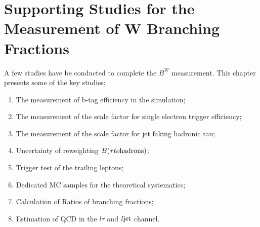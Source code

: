 \chapter{Supporting Studies for the Measurement of W Branching Fractions}
\label{sec:app}

A few studies have be conducted to complete the $B^W$ measurement. This chapter presents some of the key studies:
\begin{enumerate}
    \item The measurement of b-tag efficiency in the simulation;
    \item The measurement of the scale factor for single electron trigger efficiency;
    \item The measurement of the scale factor for jet faking hadronic tau;
    \item Uncertainty of reweighting $B(\tau \to  \rm{hadrons})$;
    \item Trigger test of the trailing leptons;
    \item Dedicated MC samples for the \ttbar theoretical systematics;
    \item Calculation of Ratios of branching fractions;
    \item Estimation of QCD in the $l\tau$ and $l\rm{jet}$ channel.
\end{enumerate}











